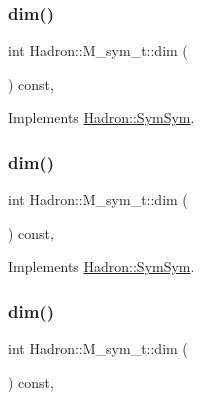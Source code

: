 \subsubsection{\texorpdfstring{dim()}{dim()}\hspace{0.1cm}{\footnotesize\ttfamily [3/5]}}
{\footnotesize\ttfamily int Hadron\+::\+M\+\_\+sym\+\_\+t\+::dim (\begin{DoxyParamCaption}{ }\end{DoxyParamCaption}) const\hspace{0.3cm}{\ttfamily [inline]}, {\ttfamily [virtual]}}



Implements \mbox{\hyperlink{structHadron_1_1SymSym_ae57780f41b9f6c03c6056eed3677bd48}{Hadron\+::\+Sym\+Sym}}.

\mbox{\label{structHadron_1_1M__sym__t_a9ee8ba6fd6c2220231052690b2995ed5}} 
\subsubsection{\texorpdfstring{dim()}{dim()}\hspace{0.1cm}{\footnotesize\ttfamily [4/5]}}
{\footnotesize\ttfamily int Hadron\+::\+M\+\_\+sym\+\_\+t\+::dim (\begin{DoxyParamCaption}{ }\end{DoxyParamCaption}) const\hspace{0.3cm}{\ttfamily [inline]}, {\ttfamily [virtual]}}



Implements \mbox{\hyperlink{structHadron_1_1SymSym_ae57780f41b9f6c03c6056eed3677bd48}{Hadron\+::\+Sym\+Sym}}.

\mbox{\label{structHadron_1_1M__sym__t_a9ee8ba6fd6c2220231052690b2995ed5}} 
\subsubsection{\texorpdfstring{dim()}{dim()}\hspace{0.1cm}{\footnotesize\ttfamily [5/5]}}
{\footnotesize\ttfamily int Hadron\+::\+M\+\_\+sym\+\_\+t\+::dim (\begin{DoxyParamCaption}{ }\end{DoxyParamCaption}) const\hspace{0.3cm}{\ttfamily [inline]}, {\ttfamily [virtual]}}



